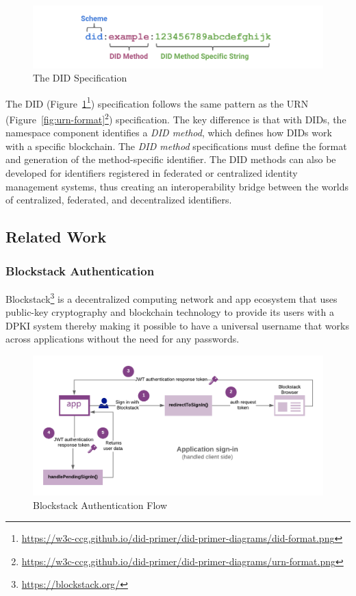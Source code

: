 		\begin{figure}[h]
			\includegraphics[width=\linewidth]{figures/did-format}
			\caption{\label{fig:did-format} The DID Specification}
		\end{figure}
		
		The DID (Figure~\ref{fig:did-format}\footnote{\url{https://w3c-ccg.github.io/did-primer/did-primer-diagrams/did-format.png}}) specification follows the same pattern as the URN (Figure~\ref{fig:urn-format}\footnote{\url{https://w3c-ccg.github.io/did-primer/did-primer-diagrams/urn-format.png}}) specification. The key difference is that with DIDs, the namespace component identifies a \textit{DID method}, which defines how DIDs work with a specific blockchain. The \textit{DID method} specifications must define the format and generation of the method-specific identifier. The DID methods can also be developed for identifiers registered in federated or centralized identity management systems, thus creating an interoperability bridge between the worlds of centralized, federated, and decentralized identifiers.
	
	\subsection{Related Work}
		\subsubsection{Blockstack Authentication}\label{sec:blockstack-auth}
		Blockstack\footnote{\url{https://blockstack.org/}} is a decentralized computing network and app ecosystem that uses public-key cryptography and blockchain technology to provide its users with a DPKI system thereby making it possible to have a universal username that works across applications without the need for any passwords.
		
		\begin{figure}[h]
			\includegraphics[width=\linewidth]{figures/app-sign-in}
			\caption{\label{fig:app-sign-in} Blockstack Authentication Flow\protect\footnotemark}
		\end{figure}
		
